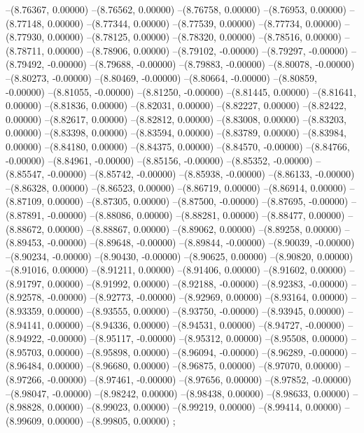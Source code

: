 --(8.76367, 0.00000)
--(8.76562, 0.00000)
--(8.76758, 0.00000)
--(8.76953, 0.00000)
--(8.77148, 0.00000)
--(8.77344, 0.00000)
--(8.77539, 0.00000)
--(8.77734, 0.00000)
--(8.77930, 0.00000)
--(8.78125, 0.00000)
--(8.78320, 0.00000)
--(8.78516, 0.00000)
--(8.78711, 0.00000)
--(8.78906, 0.00000)
--(8.79102, -0.00000)
--(8.79297, -0.00000)
--(8.79492, -0.00000)
--(8.79688, -0.00000)
--(8.79883, -0.00000)
--(8.80078, -0.00000)
--(8.80273, -0.00000)
--(8.80469, -0.00000)
--(8.80664, -0.00000)
--(8.80859, -0.00000)
--(8.81055, -0.00000)
--(8.81250, -0.00000)
--(8.81445, 0.00000)
--(8.81641, 0.00000)
--(8.81836, 0.00000)
--(8.82031, 0.00000)
--(8.82227, 0.00000)
--(8.82422, 0.00000)
--(8.82617, 0.00000)
--(8.82812, 0.00000)
--(8.83008, 0.00000)
--(8.83203, 0.00000)
--(8.83398, 0.00000)
--(8.83594, 0.00000)
--(8.83789, 0.00000)
--(8.83984, 0.00000)
--(8.84180, 0.00000)
--(8.84375, 0.00000)
--(8.84570, -0.00000)
--(8.84766, -0.00000)
--(8.84961, -0.00000)
--(8.85156, -0.00000)
--(8.85352, -0.00000)
--(8.85547, -0.00000)
--(8.85742, -0.00000)
--(8.85938, -0.00000)
--(8.86133, -0.00000)
--(8.86328, 0.00000)
--(8.86523, 0.00000)
--(8.86719, 0.00000)
--(8.86914, 0.00000)
--(8.87109, 0.00000)
--(8.87305, 0.00000)
--(8.87500, -0.00000)
--(8.87695, -0.00000)
--(8.87891, -0.00000)
--(8.88086, 0.00000)
--(8.88281, 0.00000)
--(8.88477, 0.00000)
--(8.88672, 0.00000)
--(8.88867, 0.00000)
--(8.89062, 0.00000)
--(8.89258, 0.00000)
--(8.89453, -0.00000)
--(8.89648, -0.00000)
--(8.89844, -0.00000)
--(8.90039, -0.00000)
--(8.90234, -0.00000)
--(8.90430, -0.00000)
--(8.90625, 0.00000)
--(8.90820, 0.00000)
--(8.91016, 0.00000)
--(8.91211, 0.00000)
--(8.91406, 0.00000)
--(8.91602, 0.00000)
--(8.91797, 0.00000)
--(8.91992, 0.00000)
--(8.92188, -0.00000)
--(8.92383, -0.00000)
--(8.92578, -0.00000)
--(8.92773, -0.00000)
--(8.92969, 0.00000)
--(8.93164, 0.00000)
--(8.93359, 0.00000)
--(8.93555, 0.00000)
--(8.93750, -0.00000)
--(8.93945, 0.00000)
--(8.94141, 0.00000)
--(8.94336, 0.00000)
--(8.94531, 0.00000)
--(8.94727, -0.00000)
--(8.94922, -0.00000)
--(8.95117, -0.00000)
--(8.95312, 0.00000)
--(8.95508, 0.00000)
--(8.95703, 0.00000)
--(8.95898, 0.00000)
--(8.96094, -0.00000)
--(8.96289, -0.00000)
--(8.96484, 0.00000)
--(8.96680, 0.00000)
--(8.96875, 0.00000)
--(8.97070, 0.00000)
--(8.97266, -0.00000)
--(8.97461, -0.00000)
--(8.97656, 0.00000)
--(8.97852, -0.00000)
--(8.98047, -0.00000)
--(8.98242, 0.00000)
--(8.98438, 0.00000)
--(8.98633, 0.00000)
--(8.98828, 0.00000)
--(8.99023, 0.00000)
--(8.99219, 0.00000)
--(8.99414, 0.00000)
--(8.99609, 0.00000)
--(8.99805, 0.00000)
;
